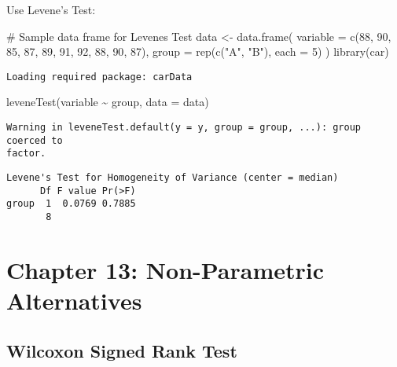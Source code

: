 \documentclass[
  letterpaper,
  DIV=11,
  numbers=noendperiod]{scrreprt}
\newenvironment{Shaded}{\begin{snugshade}}{\end{snugshade}}
\newcommand{\AttributeTok}[1]{\textcolor[rgb]{0.40,0.45,0.13}{#1}}
\newcommand{\CommentTok}[1]{\textcolor[rgb]{0.37,0.37,0.37}{#1}}
\newcommand{\DecValTok}[1]{\textcolor[rgb]{0.68,0.00,0.00}{#1}}
\newcommand{\FunctionTok}[1]{\textcolor[rgb]{0.28,0.35,0.67}{#1}}
\newcommand{\NormalTok}[1]{\textcolor[rgb]{0.00,0.23,0.31}{#1}}
\newcommand{\OtherTok}[1]{\textcolor[rgb]{0.00,0.23,0.31}{#1}}
\newcommand{\SpecialCharTok}[1]{\textcolor[rgb]{0.37,0.37,0.37}{#1}}
\newcommand{\StringTok}[1]{\textcolor[rgb]{0.13,0.47,0.30}{#1}}
\begin{document}
Use Levene's Test:

\begin{Shaded}
\begin{Highlighting}[]
\CommentTok{\# Sample data frame for Levene\textquotesingle{}s Test}
\NormalTok{data }\OtherTok{\textless{}{-}} \FunctionTok{data.frame}\NormalTok{(}
  \AttributeTok{variable =} \FunctionTok{c}\NormalTok{(}\DecValTok{88}\NormalTok{, }\DecValTok{90}\NormalTok{, }\DecValTok{85}\NormalTok{, }\DecValTok{87}\NormalTok{, }\DecValTok{89}\NormalTok{, }\DecValTok{91}\NormalTok{, }\DecValTok{92}\NormalTok{, }\DecValTok{88}\NormalTok{, }\DecValTok{90}\NormalTok{, }\DecValTok{87}\NormalTok{),}
  \AttributeTok{group =} \FunctionTok{rep}\NormalTok{(}\FunctionTok{c}\NormalTok{(}\StringTok{"A"}\NormalTok{, }\StringTok{"B"}\NormalTok{), }\AttributeTok{each =} \DecValTok{5}\NormalTok{)}
\NormalTok{)}
\FunctionTok{library}\NormalTok{(car)}
\end{Highlighting}
\end{Shaded}

\begin{verbatim}
Loading required package: carData
\end{verbatim}

\begin{Shaded}
\begin{Highlighting}[]
\FunctionTok{leveneTest}\NormalTok{(variable }\SpecialCharTok{\textasciitilde{}}\NormalTok{ group, }\AttributeTok{data =}\NormalTok{ data)}
\end{Highlighting}
\end{Shaded}

\begin{verbatim}
Warning in leveneTest.default(y = y, group = group, ...): group coerced to
factor.
\end{verbatim}

\begin{verbatim}
Levene's Test for Homogeneity of Variance (center = median)
      Df F value Pr(>F)
group  1  0.0769 0.7885
       8               
\end{verbatim}

\section{Chapter 13: Non-Parametric
Alternatives}\label{chapter-13-non-parametric-alternatives}

\subsection{Wilcoxon Signed Rank Test}\label{wilcoxon-signed-rank-test}
\end{document}

